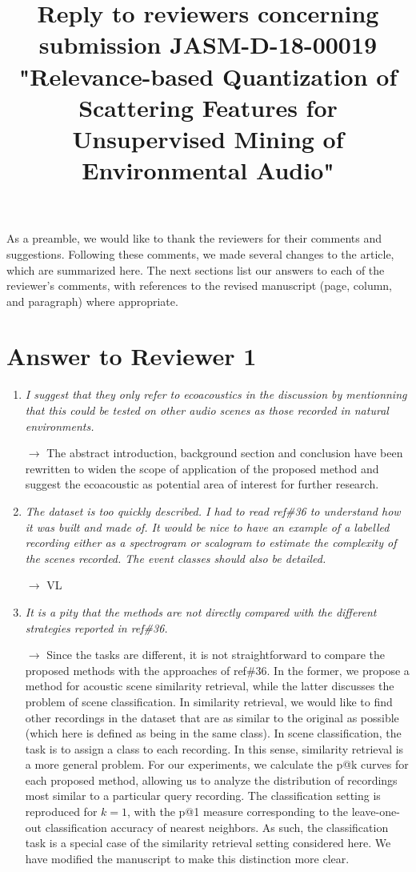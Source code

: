 \documentclass[10pt]{article}
\title{Reply to reviewers concerning submission JASM-D-18-00019 "Relevance-based Quantization of Scattering Features for Unsupervised Mining of Environmental Audio"}
\begin{document}
\maketitle

As a preamble, we would like to thank the reviewers for their comments and suggestions. Following these comments, we made several changes to the article, which are summarized here. The next sections list our answers to each of the reviewer’s comments, with references to the revised manuscript (page, column, and paragraph) where appropriate.

\section{Answer to Reviewer 1}

\begin{enumerate}

\item \emph{I suggest that they only refer to ecoacoustics in the discussion by mentionning that this could be tested on other audio scenes as those recorded in natural environments.}

$\rightarrow$ The abstract introduction, background section and conclusion have been rewritten to widen the scope of application of the proposed method and suggest the ecoacoustic as potential area of interest for further research.

\item \emph{The dataset is too quickly described. I had to read ref\#36 to understand how it was built and made of. It would be nice to have an example of a labelled recording either as a spectrogram or scalogram to estimate the complexity of the scenes recorded. The event classes should also be detailed.}

$\rightarrow$ VL

\item \emph{It is a pity that the methods are not directly compared with the different strategies reported in ref\#36.}

$\rightarrow$
Since the tasks are different, it is not straightforward to compare the proposed methods with the approaches of ref\#36. In the former, we propose a method for acoustic scene similarity retrieval, while the latter discusses the problem of scene classification. In similarity retrieval, we would like to find other recordings in the dataset that are as similar to the original as possible (which here is defined as being in the same class). In scene classification, the task is to assign a class to each recording. In this sense, similarity retrieval is a more general problem. For our experiments, we calculate the p@k curves for each proposed method, allowing us to analyze the distribution of recordings most similar to a particular query recording. The classification setting is reproduced for $k = 1$, with the p@1 measure corresponding to the leave-one-out classification accuracy of nearest neighbors. As such, the classification task is a special case of the similarity retrieval setting considered here. We have modified the manuscript to make this distinction more clear.


\end{enumerate}
\end{document}
